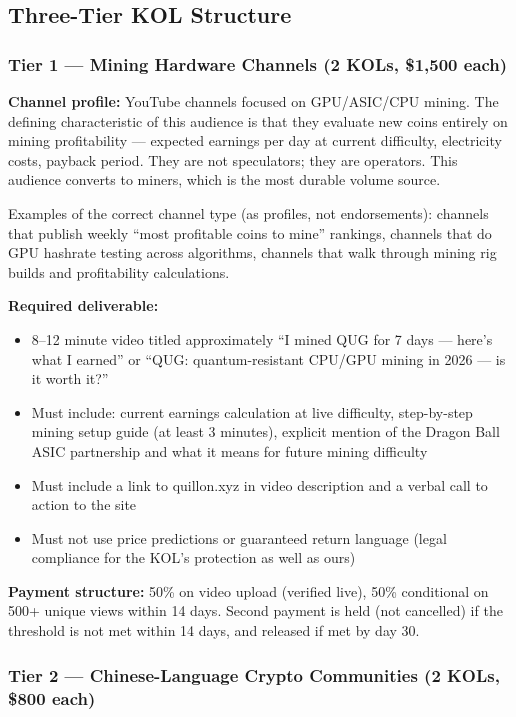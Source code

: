 \documentclass[11pt,a4paper]{article}
\begin{document}
\subsection{Three-Tier KOL Structure}

\subsubsection{Tier 1 — Mining Hardware Channels (2 KOLs, \$1,500 each)}

\textbf{Channel profile:} YouTube channels focused on GPU/ASIC/CPU mining. The defining characteristic of this audience is that they evaluate new coins entirely on mining profitability — expected earnings per day at current difficulty, electricity costs, payback period. They are not speculators; they are operators. This audience converts to miners, which is the most durable volume source.

Examples of the correct channel type (as profiles, not endorsements): channels that publish weekly ``most profitable coins to mine'' rankings, channels that do GPU hashrate testing across algorithms, channels that walk through mining rig builds and profitability calculations.

\textbf{Required deliverable:}
\begin{itemize}[leftmargin=1em, itemsep=0pt]
  \item 8--12 minute video titled approximately ``I mined QUG for 7 days — here's what I earned'' or ``QUG: quantum-resistant CPU/GPU mining in 2026 — is it worth it?''
  \item Must include: current earnings calculation at live difficulty, step-by-step mining setup guide (at least 3 minutes), explicit mention of the Dragon Ball ASIC partnership and what it means for future mining difficulty
  \item Must include a link to quillon.xyz in video description and a verbal call to action to the site
  \item Must not use price predictions or guaranteed return language (legal compliance for the KOL's protection as well as ours)
\end{itemize}

\textbf{Payment structure:} 50\% on video upload (verified live), 50\% conditional on 500+ unique views within 14 days. Second payment is held (not cancelled) if the threshold is not met within 14 days, and released if met by day 30.

\subsubsection{Tier 2 — Chinese-Language Crypto Communities (2 KOLs, \$800 each)}
\end{document}
